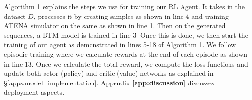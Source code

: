 Algorithm 1 explains the steps we use for training our RL Agent. It takes in the dataset $D$, processes it by creating samples as shown in line 4 and training ATENA simulator on the same as shown in line 1. Then on the generated sequences, a BTM model is trained in line 3. Once this is done, we then start the training of our agent as demonstrated in lines 5-18 of Algorithm 1. We follow episodic training where we calculate rewards at the end of each episode as shown in line 13. Once we calculate the total reward, we compute the loss functions and update both actor (policy) and critic (value) networks as explained in \S{\ref{apps:model_implementation}}. Appendix \textbf{\ref{app:discussion}} discusses deployment aspects.





